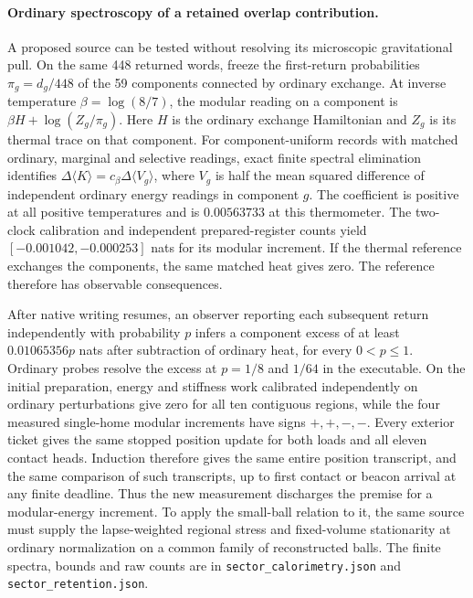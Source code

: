 \documentclass[11pt]{article}
\begin{document}
\paragraph{Ordinary spectroscopy of a retained overlap contribution.}
A proposed source can be tested without resolving its microscopic
gravitational pull. On the same 448 returned words, freeze the
first-return probabilities \(\pi_g=d_g/448\) of the 59 components
connected by ordinary exchange. At inverse temperature
\(\beta=\log(8/7)\), the modular reading on a component is
\(\beta H+\log(Z_g/\pi_g)\). Here \(H\) is the ordinary exchange
Hamiltonian and \(Z_g\) is its thermal trace on that component.
For component-uniform records with matched ordinary, marginal and
selective readings, exact finite spectral elimination identifies
\(\Delta\langle K\rangle=c_\beta\Delta\langle V_g\rangle\), where
\(V_g\) is half the mean squared difference of independent ordinary
energy readings in component \(g\). The coefficient is positive at
all positive temperatures and is \(0.00563733\) at this thermometer.
The two-clock calibration and independent prepared-register counts yield
\([-0.001042,-0.000253]\) nats for its modular increment. If the
thermal reference exchanges the components, the same matched heat
gives zero. The reference therefore has observable consequences.

After native writing resumes, an observer reporting each subsequent
return independently with probability \(p\) infers a component
excess of at least \(0.01065356p\) nats after subtraction of ordinary
heat, for every \(0<p\leq1\). Ordinary probes resolve the excess at
\(p=1/8\) and \(1/64\) in the executable. On the initial preparation,
energy and stiffness work calibrated independently on ordinary
perturbations give zero for all ten contiguous regions, while the
four measured single-home modular increments have signs \(+,+,-,-\).
Every exterior ticket gives the same stopped position update for
both loads and all eleven contact heads. Induction therefore gives
the same entire position transcript, and the same comparison of such
transcripts, up to first contact or beacon arrival at any finite
deadline. Thus the new measurement
discharges the premise for a modular-energy increment. To apply
the small-ball relation to it, the same source must supply the
lapse-weighted regional stress and fixed-volume stationarity at
ordinary normalization on a common family of reconstructed balls.
The finite spectra, bounds and raw counts are in
\texttt{sector\_calorimetry.json} and \texttt{sector\_retention.json}.
\end{document}
